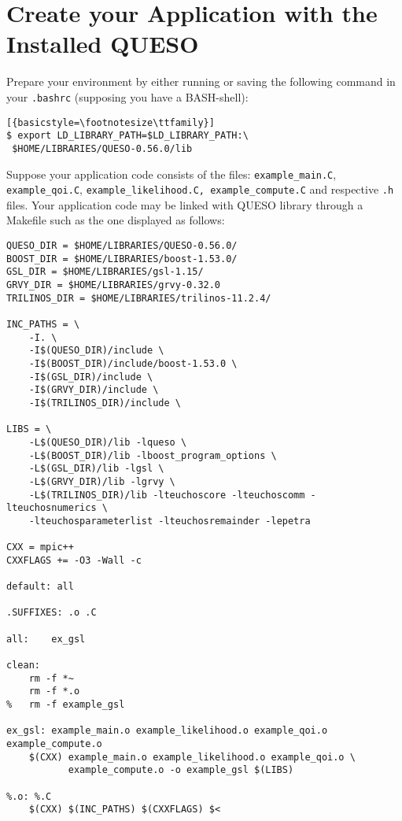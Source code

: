 \section{Create your Application with the Installed QUESO} \label{sc-use-queso}

Prepare your environment by either running or saving the following command in
your \verb+.bashrc+ (supposing you have a BASH-shell):
\begin{lstlisting}[{basicstyle=\footnotesize\ttfamily}]
$ export LD_LIBRARY_PATH=$LD_LIBRARY_PATH:\
 $HOME/LIBRARIES/QUESO-0.56.0/lib
\end{lstlisting}



Suppose your application code consists of the files:  \verb+example_main.C+,
\verb+example_qoi.C+,  \verb+example_likelihood.C, example_compute.C+ and
respective \verb+.h+ files. Your application code may be linked with QUESO
library through a Makefile such as the one displayed as follows:

\begin{lstlisting}[basicstyle={\footnotesize\ttfamily},deletekeywords={export,rm}]
QUESO_DIR = $HOME/LIBRARIES/QUESO-0.56.0/
BOOST_DIR = $HOME/LIBRARIES/boost-1.53.0/
GSL_DIR = $HOME/LIBRARIES/gsl-1.15/
GRVY_DIR = $HOME/LIBRARIES/grvy-0.32.0
TRILINOS_DIR = $HOME/LIBRARIES/trilinos-11.2.4/

INC_PATHS = \
	-I. \
	-I$(QUESO_DIR)/include \
	-I$(BOOST_DIR)/include/boost-1.53.0 \
	-I$(GSL_DIR)/include \
	-I$(GRVY_DIR)/include \
	-I$(TRILINOS_DIR)/include \

LIBS = \
	-L$(QUESO_DIR)/lib -lqueso \
	-L$(BOOST_DIR)/lib -lboost_program_options \
	-L$(GSL_DIR)/lib -lgsl \
	-L$(GRVY_DIR)/lib -lgrvy \
	-L$(TRILINOS_DIR)/lib -lteuchoscore -lteuchoscomm -lteuchosnumerics \
	-lteuchosparameterlist -lteuchosremainder -lepetra

CXX = mpic++
CXXFLAGS += -O3 -Wall -c

default: all

.SUFFIXES: .o .C

all:	ex_gsl

clean:
	rm -f *~
	rm -f *.o
% 	rm -f example_gsl

ex_gsl: example_main.o example_likelihood.o example_qoi.o example_compute.o
	$(CXX) example_main.o example_likelihood.o example_qoi.o \
	       example_compute.o -o example_gsl $(LIBS)

%.o: %.C
	$(CXX) $(INC_PATHS) $(CXXFLAGS) $<
\end{lstlisting}
% 
